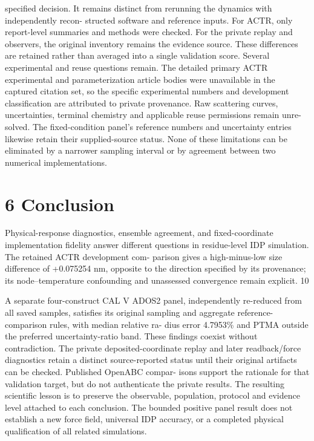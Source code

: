 \documentclass[11pt]{article}
\begin{document}
specified decision. It remains distinct from rerunning the dynamics with independently recon-
structed software and reference inputs. For ACTR, only report-level summaries and methods were
checked. For the private replay and observers, the original inventory remains the evidence source.
These differences are retained rather than averaged into a single validation score.
Several experimental and reuse questions remain. The detailed primary ACTR experimental
and parameterization article bodies were unavailable in the captured citation set, so the specific
experimental numbers and development classification are attributed to private provenance. Raw
scattering curves, uncertainties, terminal chemistry and applicable reuse permissions remain unre-
solved. The fixed-condition panel’s reference numbers and uncertainty entries likewise retain their
supplied-source status. None of these limitations can be eliminated by a narrower sampling interval
or by agreement between two numerical implementations.

\section*{6 Conclusion}

Physical-response diagnostics, ensemble agreement, and fixed-coordinate implementation fidelity
answer different questions in residue-level IDP simulation. The retained ACTR development com-
parison gives a high-minus-low size difference of +0.075254 nm, opposite to the direction specified
by its provenance; its node–temperature confounding and unassessed convergence remain explicit.
10

A separate four-construct CAL V ADOS2 panel, independently re-reduced from all saved samples,
satisfies its original sampling and aggregate reference-comparison rules, with median relative ra-
dius error 4.7953\% and PTMA outside the preferred uncertainty-ratio band. These findings coexist
without contradiction.
The private deposited-coordinate replay and later readback/force diagnostics retain a distinct
source-reported status until their original artifacts can be checked. Published OpenABC compar-
isons support the rationale for that validation target, but do not authenticate the private results.
The resulting scientific lesson is to preserve the observable, population, protocol and evidence level
attached to each conclusion. The bounded positive panel result does not establish a new force field,
universal IDP accuracy, or a completed physical qualification of all related simulations.
\end{document}
